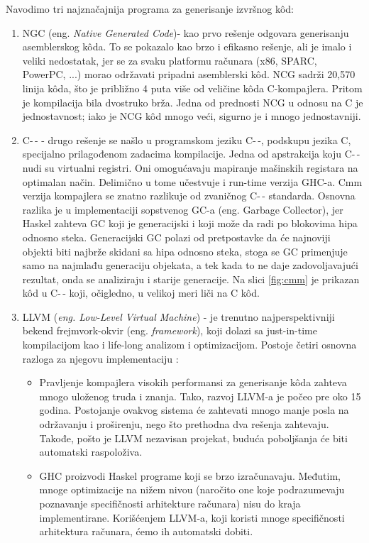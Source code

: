 Navodimo tri najznačajnija programa za generisanje izvršnog k\^{o}d:
\begin{enumerate}
	\item  NGC (eng.\emph{ Native Generated Code})- kao prvo rešenje odgovara generisanju asemblerskog k\^{o}da. To se pokazalo kao brzo i efikasno rešenje, ali je imalo i veliki nedostatak, jer se za svaku platformu računara (x86, SPARC, PowerPC, ...) morao održavati pripadni asemblerski k\^{o}d.
	NCG sadrži 20,570 linija k\^{o}da, što je približno 4 puta više od veličine k\^{o}da C-kompajlera. Pritom je kompilacija bila dvostruko brža. Jedna od prednosti NCG u odnosu na C je jednostavnost; iako je NCG k\^{o}d mnogo veći, sigurno je i mnogo jednostavniji.
	\item  C-\,- - drugo rešenje se našlo u programskom jeziku C-\,-, podskupu jezika C, specijalno prilagođenom zadacima kompilacije. Jedna od apstrakcija koju C-\,- nudi su virtualni registri. Oni omogućavaju mapiranje mašinskih registara na optimalan način. Delimično u tome učestvuje i run-time verzija GHC-a. Cmm verzija kompajlera se znatno razlikuje od zvaničnog C-\,- standarda. Osnovna razlika je u  implementaciji sopstvenog GC-a (eng. Garbage Collector), jer Haskel zahteva GC koji je generacijski i koji može da radi po blokovima hipa odnosno steka. Generacijski GC polazi od pretpostavke da će najnoviji objekti biti najbrže skidani sa hipa odnosno steka, stoga se GC primenjuje samo na najmlađu generaciju objekata, a tek kada to ne daje zadovoljavajući rezultat, onda se analiziraju i starije generacije. Na slici \ref{fig:cmm} je prikazan k\^{o}d u C-\,- koji, očigledno, u velikoj meri liči na C k\^{o}d. 
	\item LLVM (\emph{eng. Low-Level Virtual Machine}) - je trenutno najperspektivniji bekend frejmvork-okvir (eng. \emph{framework}), koji dolazi sa just-in-time kompilacijom kao i life-long analizom i optimizacijom. Postoje četiri osnovna razloga za njegovu implementaciju \cite{Ter10}:
	\begin{itemize}
		\item Pravljenje kompajlera visokih performansi za generisanje k\^{o}da zahteva mnogo uloženog truda i znanja. Tako, razvoj LLVM-a je počeo pre oko 15 godina. Postojanje ovakvog sistema će zahtevati mnogo manje posla na održavanju i proširenju, nego što prethodna dva rešenja zahtevaju. Takođe, pošto je LLVM nezavisan projekat, buduća poboljšanja će biti automatski raspoloživa. 
		\item GHC proizvodi Haskel programe koji se brzo izračunavaju. Međutim, mnoge optimizacije na nižem nivou (naročito one koje podrazumevaju poznavanje specifičnosti arhitekture računara) nisu do kraja implementirane. Korišćenjem LLVM-a, koji koristi mnoge specifičnosti arhitektura računara, ćemo ih automatski dobiti.

\end{itemize}
\end{enumerate}
